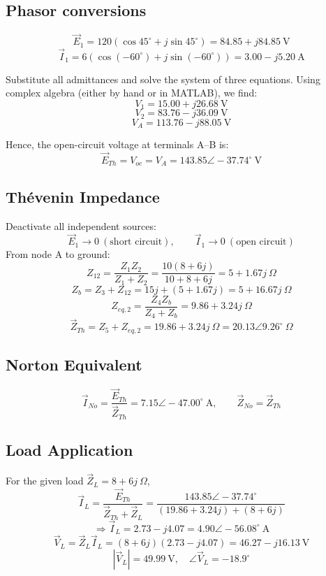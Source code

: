 \documentclass[a4paper,12pt]{article}
\begin{document}
\subsection*{Phasor conversions}
\[
\vec E_1 = 120(\cos45^\circ + j\sin45^\circ) 
= 84.85 + j84.85~\text{V}
\]
\[
\vec I_1 = 6(\cos(-60^\circ) + j\sin(-60^\circ))
= 3.00 - j5.20~\text{A}
\]

\noindent
Substitute all admittances and solve the system of three equations.  
Using complex algebra (either by hand or in MATLAB), we find:
\[
V_1 = 15.00 + j26.68~\text{V}
\]
\[
V_2 = 83.76 - j36.09~\text{V}
\]
\[
V_A = 113.76 - j88.05~\text{V}
\]

\noindent
Hence, the open-circuit voltage at terminals A–B is:
\[
\boxed{\vec E_{Th} = V_{oc} = V_A = 143.85\angle -37.74^\circ~\text{V}}
\]

\subsection*{Thévenin Impedance}
Deactivate all independent sources:
\[
\vec E_1 \to 0~(\text{short circuit}), \qquad
\vec I_1 \to 0~(\text{open circuit})
\]
\noindent
From node A to ground:
\[
Z_{12} = \frac{Z_1Z_2}{Z_1 + Z_2} 
= \frac{10(8+6j)}{10+8+6j} = 5 + 1.67j~\Omega
\]
\[
Z_b = Z_3 + Z_{12} = 15j + (5 + 1.67j) = 5 + 16.67j~\Omega
\]
\[
Z_{eq,2} = \frac{Z_4 Z_b}{Z_4 + Z_b} 
= 9.86 + 3.24j~\Omega
\]
\[
\boxed{\vec Z_{Th} = Z_5 + Z_{eq,2} 
= 19.86 + 3.24j~\Omega = 20.13\angle 9.26^\circ~\Omega}
\]

\subsection*{Norton Equivalent}
\[
\boxed{\vec I_{No} = \frac{\vec E_{Th}}{\vec Z_{Th}} 
= 7.15\angle -47.00^\circ~\text{A}}, 
\qquad \boxed{\vec Z_{No} = \vec Z_{Th}}
\]

\subsection*{Load Application}
For the given load \( \vec Z_L = 8 + 6j~\Omega \),
\[
\vec I_L = \frac{\vec E_{Th}}{\vec Z_{Th} + \vec Z_L} 
= \frac{143.85\angle -37.74^\circ}
{(19.86 + 3.24j) + (8 + 6j)}
\]
\[
\Rightarrow \vec I_L = 2.73 - j4.07 
= \boxed{4.90\angle -56.08^\circ~\text{A}}
\]
\[
\vec V_L = \vec Z_L \vec I_L 
= (8+6j)(2.73 - j4.07) 
= 46.27 - j16.13~\text{V}
\]
\[
\boxed{|\vec V_L| = 49.99~\text{V}, \quad 
\angle \vec V_L = -18.9^\circ}
\]
\end{document}
